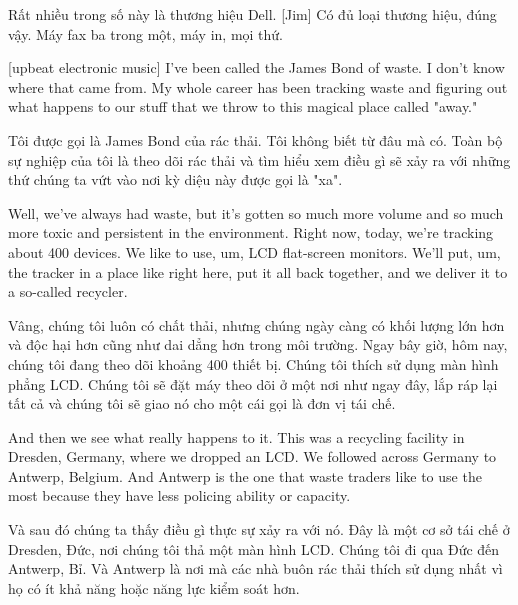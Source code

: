 \documentclass[a4paper]{article}
\begin{document}
	\begin{vietnamese-v2}
		[phụ nữ] Rất nhiều trong số này là thương hiệu Dell.
		[Jim] Có đủ loại thương hiệu, đúng vậy.
		Máy fax ba trong một, máy in, mọi thứ.
	\end{vietnamese-v2}
	
	[upbeat electronic music]
	I've been called the James Bond of waste.
	I don't know where that came from.
	My whole career has been tracking waste and figuring out what happens to our stuff that we throw to this magical place called "away."
	
	\begin{vietnamese-v2}
		Tôi được gọi là James Bond của rác thải.
		Tôi không biết từ đâu mà có.
		Toàn bộ sự nghiệp của tôi là theo dõi rác thải và tìm hiểu xem điều gì sẽ xảy ra với những thứ chúng ta vứt vào nơi kỳ diệu này được gọi là "xa".
	\end{vietnamese-v2}
	
	Well, we've always had waste, but it's gotten so much more volume and so much more toxic and persistent in the environment.
	Right now, today, we're tracking about 400 devices.
	We like to use, um, LCD flat-screen monitors.
	We'll put, um, the tracker in a place like right here, put it all back together, and we deliver it to a so-called recycler.
	
	\begin{vietnamese-v2}
		Vâng, chúng tôi luôn có chất thải, nhưng chúng ngày càng có khối lượng lớn hơn và độc hại hơn cũng như dai dẳng hơn trong môi trường.
		Ngay bây giờ, hôm nay, chúng tôi đang theo dõi khoảng 400 thiết bị.
		Chúng tôi thích sử dụng màn hình phẳng LCD.
		Chúng tôi sẽ đặt máy theo dõi ở một nơi như ngay đây, lắp ráp lại tất cả và chúng tôi sẽ giao nó cho một cái gọi là đơn vị tái chế.
	\end{vietnamese-v2}
	
	And then we see what really happens to it.
	This was a recycling facility in Dresden, Germany, where we dropped an LCD.
	We followed across Germany to Antwerp, Belgium.
	And Antwerp is the one that waste traders like to use the most because they have less policing ability or capacity.
	
	\begin{vietnamese-v2}
		Và sau đó chúng ta thấy điều gì thực sự xảy ra với nó.
		Đây là một cơ sở tái chế ở Dresden, Đức, nơi chúng tôi thả một màn hình LCD.
		Chúng tôi đi qua Đức đến Antwerp, Bỉ.
		Và Antwerp là nơi mà các nhà buôn rác thải thích sử dụng nhất vì họ có ít khả năng hoặc năng lực kiểm soát hơn.
	\end{vietnamese-v2}
	
\end{document}
